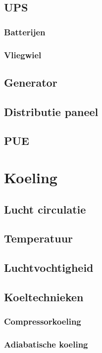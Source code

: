 \documentclass[a4paper,12pt,twoside,openright,titlepage]{book}
\begin{document}
\section{UPS}

\subsection{Batterijen}

\subsection{Vliegwiel}

\section{Generator}

\section{Distributie paneel}

\section{PUE}


\chapter{Koeling}

\section{Lucht circulatie}

\section{Temperatuur}

\section{Luchtvochtigheid}

\section{Koeltechnieken}
\subsection{Compressorkoeling}

\subsection{Adiabatische koeling}

\end{document}
